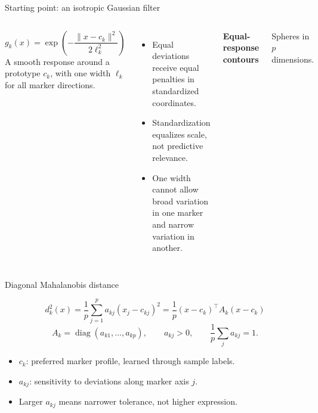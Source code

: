 \documentclass[aspectratio=169,10pt]{beamer}
\begin{document}
\begin{frame}{Starting point: an isotropic Gaussian filter}

\begin{columns}[T,onlytextwidth]
\[g_k(x)=\exp\!\left(-\frac{\|x-c_k\|^2}{2\ell_k^2}\right)\]
A smooth response around a prototype $c_k$, with one width $\ell_k$ for all marker directions.
\begin{itemize}
\item Equal deviations receive equal penalties in standardized coordinates.
\item Standardization equalizes scale, not predictive relevance.
\item One width cannot allow broad variation in one marker and narrow variation in another.
\end{itemize}
\centering
\textbf{Equal-response contours}\par
{}\par\small Spheres in $p$ dimensions.
\end{columns}

\end{frame}

\begin{frame}{Diagonal Mahalanobis distance}

\[\boxed{d_k^2(x)=\frac1p\sum_{j=1}^p a_{kj}(x_j-c_{kj})^2
=\frac1p(x-c_k)^\top A_k(x-c_k)}\]
\[A_k=\operatorname{diag}(a_{k1},\ldots,a_{kp}),\qquad a_{kj}>0,\qquad \frac1p\sum_j a_{kj}=1.\]
\begin{itemize}
\item $c_k$: preferred marker profile, learned through sample labels.
\item $a_{kj}$: sensitivity to deviations along marker axis $j$.
\item Larger $a_{kj}$ means narrower tolerance, not higher expression.
\end{itemize}

\end{frame}
\end{document}
